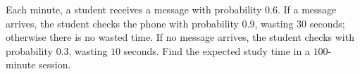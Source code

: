 Each minute, a student receives a message with probability $0.6$. If a message arrives, the student checks the phone with probability $0.9$, wasting $30$ seconds; otherwise there is no wasted time. If no message arrives, the student checks with probability $0.3$, wasting $10$ seconds. Find the expected study time in a $100$-minute session.
